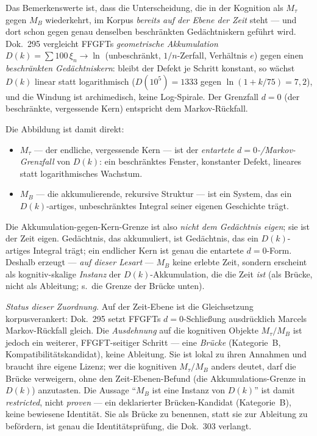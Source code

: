 Das Bemerkenswerte ist, dass die Unterscheidung, die in der Kognition als $M_\tau$ gegen
$M_B$ wiederkehrt, im Korpus \emph{bereits auf der Ebene der Zeit} steht --- und dort schon
gegen genau denselben beschränkten Gedächtniskern geführt wird. Dok.~295 vergleicht
FFGFTs \emph{geometrische Akkumulation} $D(k)=\sum 100\,\xi_n\to\ln$ (unbeschränkt,
$1/n$-Zerfall, Verhältnis $e$) gegen einen \emph{beschränkten Gedächtniskern}: bleibt der
Defekt je Schritt konstant, so wächst $D(k)$ linear statt logarithmisch
($D(10^5)=1333$ gegen $\ln(1+k/75)=7{,}2$), und die Windung ist archimedisch, keine
Log-Spirale. Der Grenzfall $d=0$ (der beschränkte, vergessende Kern) entspricht dem
Markov-Rückfall.

Die Abbildung ist damit direkt:
\begin{itemize}
\item $M_\tau$ --- der endliche, vergessende Kern --- ist der \emph{entartete
$d=0$-/Markov-Grenzfall} von $D(k)$: ein beschränktes Fenster, konstanter Defekt, lineares
statt logarithmisches Wachstum.
\item $M_B$ --- die akkumulierende, rekursive Struktur --- ist ein System, das ein
$D(k)$-artiges, unbeschränktes Integral seiner eigenen Geschichte trägt.
\end{itemize}

Die Akkumulation-gegen-Kern-Grenze ist also \emph{nicht dem Gedächtnis eigen}; sie ist der
Zeit eigen. Gedächtnis, das akkumuliert, ist Gedächtnis, das ein $D(k)$-artiges Integral
trägt; ein endlicher Kern ist genau die entartete $d=0$-Form. Deshalb erzeugt --- \emph{auf dieser Lesart} --- $M_B$ keine
erlebte Zeit, sondern erscheint als kognitiv-skalige \emph{Instanz} der $D(k)$-Akkumulation,
die die Zeit \emph{ist} (als Brücke, nicht als Ableitung; s.\ die Grenze der Brücke unten).

\emph{Status dieser Zuordnung.} Auf der Zeit-Ebene ist die Gleichsetzung korpusverankert:
Dok.~295 setzt FFGFTs $d=0$-Schließung ausdrücklich Marcels Markov-Rückfall gleich. Die
\emph{Ausdehnung} auf die kognitiven Objekte $M_\tau/M_B$ ist jedoch ein weiterer,
FFGFT-seitiger Schritt --- eine \emph{Brücke} (Kategorie~B, Kompatibilitätskandidat), keine
Ableitung. Sie ist lokal zu ihren Annahmen und braucht ihre eigene Lizenz; wer die
kognitiven $M_\tau/M_B$ anders deutet, darf die Brücke verweigern, ohne den
Zeit-Ebenen-Befund (die Akkumulations-Grenze in $D(k)$) anzutasten. Die Aussage
\enquote{$M_B$ ist eine Instanz von $D(k)$} ist damit \emph{restricted}, nicht
\emph{proven} --- ein deklarierter Brücken-Kandidat (Kategorie~B), keine bewiesene
Identität. Sie als Brücke zu
benennen, statt sie zur Ableitung zu befördern, ist genau die Identitätsprüfung, die
Dok.~303 verlangt.

